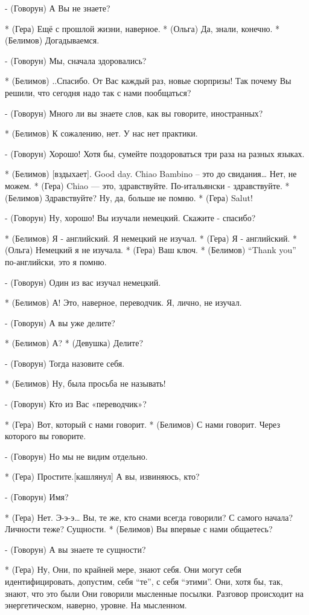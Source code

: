 - (Говорун) А Вы не знаете?

* (Гера) Ещё с прошлой жизни, наверное.
* (Ольга) Да, знали, конечно.
* (Белимов) Догадываемся.

- (Говорун) Мы, сначала здоровались?

* (Белимов) ..Спасибо. От Вас каждый раз, новые сюрпризы! Так почему Вы решили, что сегодня надо так с нами пообщаться?

- (Говорун) Много ли вы знаете слов, как вы говорите, иностранных?

* (Белимов) К сожалению, нет. У нас нет практики.

- (Говорун) Хорошо!  Хотя бы, сумейте поздороваться три раза на разных языках.

* (Белимов) [вздыхает]. Good day.  Chiao Bambino – это до свидания… Нет, не можем. 
* (Гера) Chiao — это, здравствуйте. По-итальянски - здравствуйте.
* (Белимов) Здравствуйте? Ну, да, больше не помню.
* (Гера) Salut!

- (Говорун) Ну, хорошо! Вы изучали немецкий. Скажите - спасибо?

* (Белимов) Я - английский. Я немецкий не изучал.
* (Гера)  Я - английский.
* (Ольга) Немецкий я не изучала.
* (Гера)  Ваш ключ.
* (Белимов) “Thank you” по-английски, это я помню.

- (Говорун) Один из вас изучал немецкий.

* (Белимов) А! Это, наверное, переводчик. Я, лично, не изучал.

- (Говорун) А вы уже делите?

* (Белимов) А? 
* (Девушка) Делите?

- (Говорун) Тогда назовите себя.

* (Белимов) Ну, была просьба не называть!

- (Говорун) Кто из Вас «переводчик»?

* (Гера)  Вот, который с нами говорит.
* (Белимов) С нами говорит. Через которого вы говорите.

- (Говорун) Но мы не видим отдельно.

* (Гера) Простите.[кашлянул] А вы, извиняюсь, кто?

- (Говорун) Имя?

* (Гера) Нет. Э-э-э… Вы, те же, кто снами всегда говорили? С самого начала? Личности теже? Сущности.
* (Белимов) Вы впервые с нами общаетесь?

- (Говорун) А вы знаете те сущности?

* (Гера) Ну, Они, по крайней мере, знают себя. Они могут себя идентифицировать, допустим, себя “те”, с себя “этими”. Они, хотя бы, так, знают, что это были Они говорили мысленные посылки. Разговор происходит на энергетическом, наверно, уровне. На мысленном.

